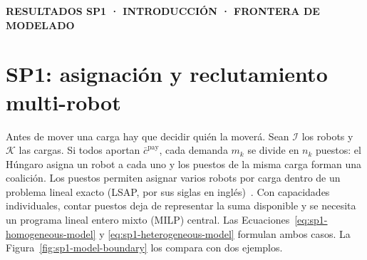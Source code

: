 \documentclass[12pt,a4paper]{article}
\newcommand{\leveltag}[1]{%
  \noindent\colorbox{VIUDark}{%
    \parbox{\dimexpr\textwidth-2\fboxsep\relax}{%
      \color{white}\sffamily\bfseries\small #1%
    }%
  }\par\smallskip
}
\begin{document}
\viuromanfoliofalse
{}
\setcounter{page}{1}

\leveltag{RESULTADOS SP1 · INTRODUCCIÓN · FRONTERA DE MODELADO}
\section*{SP1: asignación y reclutamiento multi-robot}

Antes de mover una carga hay que decidir quién la moverá. Sean $\mathcal I$ los
robots y $\mathcal K$ las cargas. Si todos aportan $\bar c^{\mathrm{pay}}$, cada
demanda $m_k$ se divide en $n_k$ puestos: el Húngaro asigna un robot a cada uno
y los puestos de la misma carga forman una coalición. Los puestos permiten
asignar varios robots por carga dentro de un problema lineal exacto (LSAP, por sus
siglas en inglés)~\parencite{kuhn1955Hungarian}. Con capacidades individuales,
contar puestos deja de representar la suma disponible y se necesita un programa
lineal entero mixto (MILP) central. Las Ecuaciones~\eqref{eq:sp1-homogeneous-model}
y \eqref{eq:sp1-heterogeneous-model} formulan ambos casos. La
Figura~\ref{fig:sp1-model-boundary} los compara con dos ejemplos.
\end{document}
